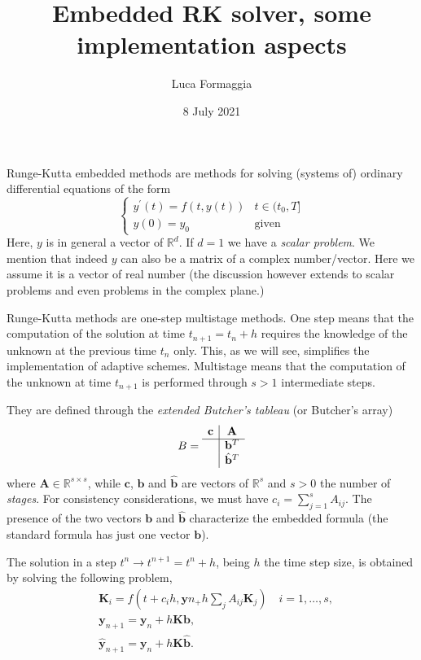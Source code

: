 \documentclass[10pt,a4paper,twoside]{article}
\title{Embedded RK solver, some implementation aspects}
\author{Luca Formaggia}
\date{8 July 2021}
\begin{document}
    \maketitle

    Runge-Kutta embedded methods are methods for solving (systems of) ordinary differential equations of the form
    \[
    \begin{cases}
    y^\prime(t)=f(t,y(t)) & t\in (t_0,T]\\
    y(0)=y_0 & \text{given}
    \end{cases}
    \]
Here, $y$ is in general a vector of $\mathbb{R}^d$. If $d=1$ we have a \emph{scalar problem}.
We mention that indeed $y$ can also be a matrix of a complex number/vector. 
Here we assume it is a vector of real number (the discussion however extends to scalar problems and 
even problems in the complex plane.)


Runge-Kutta methods are one-step multistage methods. 
One step means that the computation of the solution at time $t_{n+1}=t_n+h$ 
requires the knowledge of the unknown at the previous time $t_n$ only.
This, as we will see, simplifies the implementation of adaptive schemes.
Multistage means that the computation of the unknown at time $t_{n+1}$ 
is performed through $s>1$ intermediate steps. 


They are defined through the \emph{extended Butcher's tableau} (or Butcher's array)
\[
B=\begin{array}{c|c}
\mathbf{c}& \mathbf{A}\\
\hline
& \mathbf{b}^T\\
& \hat{\mathbf{b}}^T
\end{array}
\]
where $\mathbf{A}\in\mathbb{R}^{s\times s}$, while $\mathbf{c}$, $\mathbf{b}$ and $\hat{\mathbf{b}}$ are vectors of $\mathbb{R}^s$ and $s>0$ the number of \emph{stages}.
For consistency considerations, we must have $c_i=\sum_{j=1}^s A_{ij}$.
The presence of the two vectors $\mathbf{b}$ and $\hat{\mathbf{b}}$ 
characterize the embedded formula (the standard formula has just one vector $\mathbf{b}$).


The solution in a step $t^n\to t^{n+1}=t^n+h$, being $h$ the time step size, is obtained by solving the following problem,
\begin{align}\label{eq:rk1}
&\mathbf{K}_i = f(t+c_ih,\mathbf{y}n_+h\sum_j A_{ij}\mathbf{K}_j)\quad i=1,\ldots,s,\\
\label{eq:rkt}
&\mathbf{y}_{n+1}=\mathbf{y}_n + h \mathbf{K}\mathbf{b},\\\label{eq:rk3}
&\hat{\mathbf{y}}_{n+1}=\mathbf{y}_n + h \mathbf{K}\hat{\mathbf{b}}.
\end{align}
\end{document}

